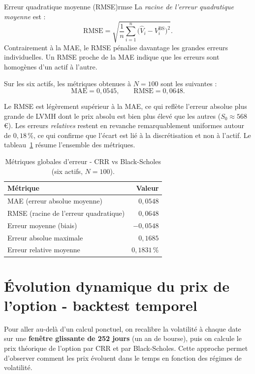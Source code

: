 \documentclass[11pt]{report}
\begin{document}
\begin{definition}{Erreur quadratique moyenne (RMSE)}{rmse}
La \textit{racine de l'erreur quadratique moyenne} est :
\[
\mathrm{RMSE} = \sqrt{\frac{1}{n}\sum_{i=1}^{n}
\bigl(\hat{V}_i - V_i^{\mathrm{BS}}\bigr)^2}.
\]
Contrairement à la MAE, le RMSE pénalise davantage les grandes erreurs
individuelles. Un RMSE proche de la MAE indique que les erreurs sont
homogènes d'un actif à l'autre.
\end{definition}

Sur les six actifs, les métriques obtenues à $N = 100$ sont les
suivantes :
\[
\mathrm{MAE} = 0{,}0545,
\qquad
\mathrm{RMSE} = 0{,}0648.
\]

Le RMSE est légèrement supérieur à la MAE, ce qui reflète l'erreur
absolue plus grande de LVMH dont le prix absolu est bien plus élevé
que les autres ($S_0 \approx 568$\,€). Les erreurs \textit{relatives}
restent en revanche remarquablement uniformes autour de $0{,}18\,\%$,
ce qui confirme que l'écart est lié à la discrétisation et non à
l'actif. Le tableau~\ref{tab:metriques_globales} résume l'ensemble
des métriques.

\begin{table}[H]
\centering
\caption{Métriques globales d'erreur - CRR vs Black-Scholes
(six actifs, $N=100$).}
\label{tab:metriques_globales}
\begin{tabular}{lr}
\toprule
Métrique & Valeur \\
\midrule
MAE  (erreur absolue moyenne)         & $0{,}0548$ \\
RMSE (racine de l'erreur quadratique) & $0{,}0648$ \\
Erreur moyenne (biais)                & $-0{,}0548$ \\
Erreur absolue maximale               & $0{,}1685$ \\
Erreur relative moyenne               & $0{,}1831\,\%$ \\
\bottomrule
\end{tabular}
\end{table}

\section{Évolution dynamique du prix de l'option - backtest temporel}

Pour aller au-delà d'un calcul ponctuel, on recalibre la volatilité à
chaque date sur une \textbf{fenêtre glissante de 252 jours} (un an de
bourse), puis on calcule le prix théorique de l'option par CRR et par
Black-Scholes. Cette approche permet d'observer comment les prix
évoluent dans le temps en fonction des régimes de volatilité.
\end{document}
